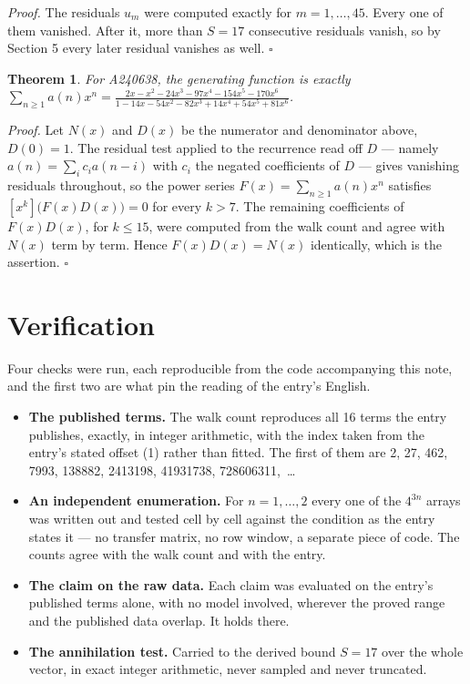 \documentclass[11pt]{article}
\newtheorem{theorem}{Theorem}
\theoremstyle{definition}
\begin{document}
{\itshape Proof.} The residuals $u_m$ were computed exactly for $m = 1,\dots,45$. Every one of them vanished. After it, more than $S = 17$ consecutive residuals vanish, so by Section 5 every later residual vanishes as well. $\square$

\begin{theorem} For A240638, the generating function is exactly $\sum_{n\ge 1} a(n)x^n = \frac{2x - x^{2} - 24x^{3} - 97x^{4} - 154x^{5} - 170x^{6}}{1 - 14x - 54x^{2} - 82x^{3} + 14x^{4} + 54x^{5} + 81x^{6}}$.\end{theorem}

{\itshape Proof.} Let $N(x)$ and $D(x)$ be the numerator and denominator above, $D(0)=1$. The residual test applied to the recurrence read off $D$ --- namely $a(n) = \sum_i c_i a(n-i)$ with $c_i$ the negated coefficients of $D$ --- gives vanishing residuals throughout, so the power series $F(x)=\sum_{n\ge 1}a(n)x^n$ satisfies $[x^k]\bigl(F(x)D(x)\bigr) = 0$ for every $k > 7$. The remaining coefficients of $F(x)D(x)$, for $k \le 15$, were computed from the walk count and agree with $N(x)$ term by term. Hence $F(x)D(x) = N(x)$ identically, which is the assertion. $\square$

\section{Verification}

Four checks were run, each reproducible from the code accompanying this note, and the first two are what pin the reading of the entry's English.

\begin{itemize}

\item {\bfseries The published terms.} The walk count reproduces all 16 terms the entry publishes, exactly, in integer arithmetic, with the index taken from the entry's stated offset (1) rather than fitted. The first of them are 2, 27, 462, 7993, 138882, 2413198, 41931738, 728606311,~\dots

\item {\bfseries An independent enumeration.} For $n = 1,\dots,2$ every one of the $4^{3n}$ arrays was written out and tested cell by cell against the condition as the entry states it --- no transfer matrix, no row window, a separate piece of code. The counts agree with the walk count and with the entry.

\item {\bfseries The claim on the raw data.} Each claim was evaluated on the entry's published terms alone, with no model involved, wherever the proved range and the published data overlap. It holds there.

\item {\bfseries The annihilation test.} Carried to the derived bound $S = 17$ over the whole vector, in exact integer arithmetic, never sampled and never truncated.

\end{itemize}
\end{document}
